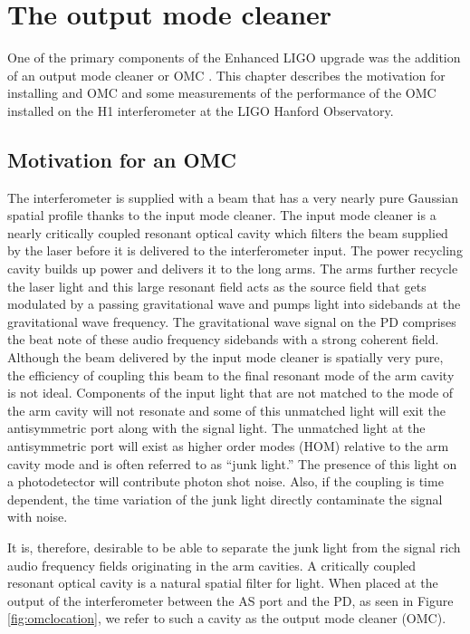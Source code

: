\chapter{The output mode cleaner}
\label{ch:omc}
One of the primary components of the Enhanced LIGO upgrade was the addition of an output mode cleaner or OMC \cite{T060156}. %
This chapter describes the motivation for installing and OMC and some measurements of the performance of the OMC installed on the H1 interferometer at the LIGO Hanford Observatory.

\section{Motivation for an OMC}
The interferometer is supplied with a beam that has a very nearly pure Gaussian spatial profile thanks to the input mode cleaner. %
The input mode cleaner is a nearly critically coupled resonant optical cavity which filters the beam supplied by the laser before it is delivered to the interferometer input. %
The power recycling cavity builds up power and delivers it to the long arms. %
The arms further recycle the laser light and this large resonant field acts as the source field that gets modulated by a passing gravitational wave and pumps light into sidebands at the gravitational wave frequency. %
The gravitational wave signal on the PD comprises the beat note of these audio frequency sidebands with a strong coherent field. %
Although the beam delivered by the input mode cleaner is spatially very pure, the efficiency of coupling this beam to the final resonant mode of the arm cavity is not ideal. %
Components of the input light that are not matched to the mode of the arm cavity will not resonate and some of this unmatched light will exit the antisymmetric port along with the signal light. %
The unmatched light at the antisymmetric port will exist as higher order modes (HOM) relative to the arm cavity mode and is often referred to as ``junk light.'' %
The presence of this light on a photodetector will contribute photon shot noise. %
Also, if the coupling is time dependent, the time variation of the junk light directly contaminate the signal with noise.

It is, therefore, desirable to be able to separate the junk light from the signal rich audio frequency fields originating in the arm cavities. %
A critically coupled resonant optical cavity is a natural spatial filter for light. %
When placed at the output of the interferometer between the AS port and the PD, as seen in Figure \ref{fig:omclocation}, we refer to such a cavity as the output mode cleaner (OMC).

